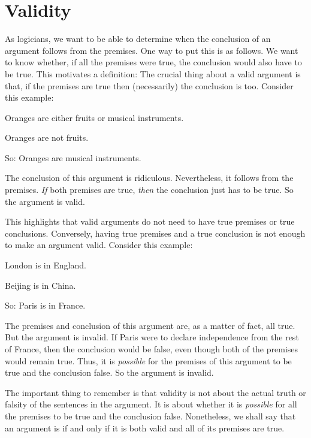 \section{Validity}
As logicians, we want to be able to determine when the conclusion of an argument follows from the premises. One way to put this is as follows. We want to know whether, if all the premises were true, the conclusion would also have to be true. This motivates a definition:
The crucial thing about a valid argument is that, if the premises are true then (necessarily) the conclusion is too. Consider this example:
	\begin{earg}
		\item[] Oranges are either fruits or musical instruments.
		\item[] Oranges are not fruits.
		\item[So:] Oranges are musical instruments.
	\end{earg}
The conclusion of this argument is ridiculous. Nevertheless, it follows from the premises. \emph{If} both premises are true, \emph{then} the conclusion just has to be true. So the argument is valid. 

This highlights that valid arguments do not need to have true premises or true conclusions. Conversely, having true premises and a true conclusion is not enough to make an argument valid. Consider this example:
	\begin{earg}
		\item[] London is in England.
		\item[] Beijing is in China.
		\item[So:] Paris is in France.
	\end{earg}
The premises and conclusion of this argument are, as a matter of fact, all true. But the argument is invalid. If Paris were to declare independence from the rest of France, then the conclusion would be false, even though both of the premises would remain true. Thus, it is \emph{possible} for the premises of this argument to be true and the conclusion false. So the argument is invalid.

The important thing to remember is that validity is not about the actual truth or falsity of the sentences in the argument. It is about whether it is \emph{possible} for all the premises to be true and the conclusion false. Nonetheless, we shall say that an argument is  if and only if it is both valid and all of its premises are true.



